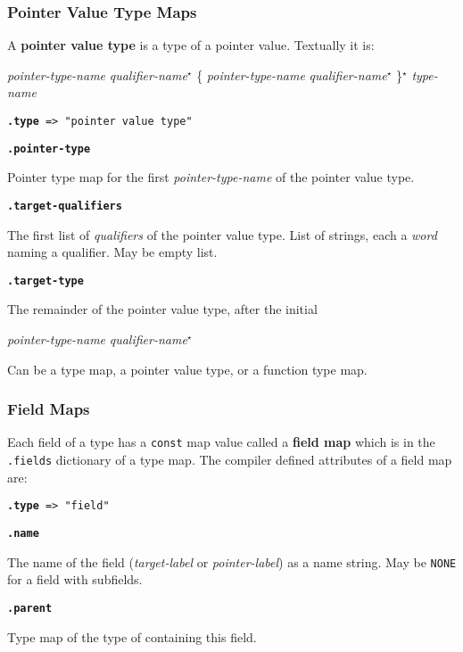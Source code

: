 \documentclass[12pt]{article}
\newcommand{\STAR}{{\Large $^\star$}}
\newcommand{\key}[1]{{\rm \bfseries #1}}
\newcommand{\ttkey}[1]{{\tt \bfseries #1}}
\newenvironment{indpar}[1][0.3in]%
	{\begin{list}{}%
		     {\setlength{\itemsep}{0in}%
		      \setlength{\topsep}{0in}%
		      \setlength{\parsep}{1ex}%
		      \setlength{\labelwidth}{#1}%
		      \setlength{\leftmargin}{#1}%
		      \addtolength{\leftmargin}{\labelsep}}%
	 \item}%
	{\end{list}}
\begin{document}
\subsubsection{Pointer Value Type Maps}
\label{POINTER-VALUE-TYPE-MAPS}

A \key{pointer value type} is a type of a pointer value.
Textually it is:
\begin{center}
{\em pointer-type-name} {\em qualifier-name}\STAR{}
\{ {\em pointer-type-name} {\em qualifier-name}\STAR{} \}\STAR{}
{\em type-name}
\end{center}

{\tt \ttkey{.type} => "pointer value type"}

\ttkey{.pointer-type}
\begin{indpar}
Pointer type map for the first {\em pointer-type-name}
of the pointer value type.
\end{indpar}

\ttkey{.target-qualifiers}
\begin{indpar}
The first list of {\em qualifiers} of the pointer value type.
List of strings, each a {\em word} naming a qualifier.
May be empty list.
\end{indpar}

\ttkey{.target-type}
\begin{indpar}
The remainder of the pointer value type, after the initial
\begin{center}
{\em pointer-type-name} {\em qualifier-name}\STAR{}
\end{center}
Can be a type map, a pointer value type, or a function type map.
\end{indpar}

\subsubsection{Field Maps}
\label{FIELD-MAPS}

Each field of a type has a {\tt const} map value called
a \key{field map} which is in the {\tt .fields} dictionary of
a type map.  The compiler defined attributes of a field map are:

{\tt \ttkey{.type} => "field"}

\ttkey{.name}
\begin{indpar}
The name of the field ({\em target-label} or {\em pointer-label})
as a name string.  May be {\tt NONE} for a field with subfields.
\end{indpar}

\ttkey{.parent}
\begin{indpar}
Type map of the type of containing this field.
\end{indpar}
\end{document}
